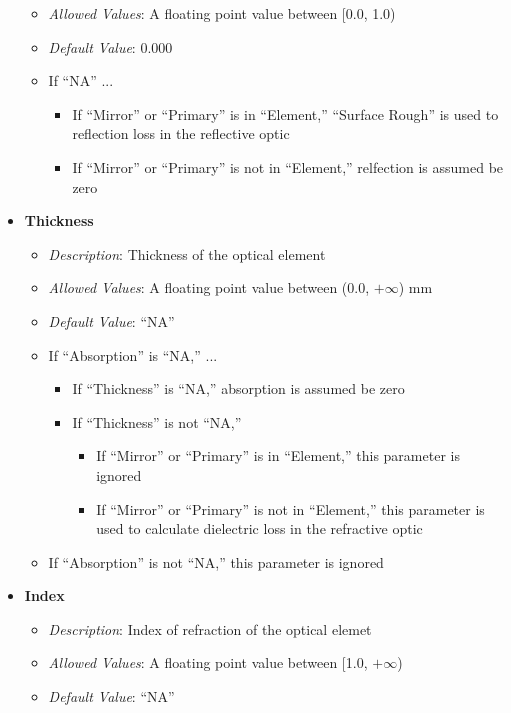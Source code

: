 \documentclass[11pt]{article} %
\begin{document}
\begin{itemize}[noitemsep,topsep=0pt]
\begin{itemize}[noitemsep,topsep=0pt]
		\item \textit{Allowed Values}: A floating point value between [0.0, 1.0)
		\item \textit{Default Value}: 0.000
		\item If ``NA'' ...
			\begin{itemize}[noitemsep,topsep=0pt]
			\item If ``Mirror'' or ``Primary'' is in ``Element,'' ``Surface Rough'' is used to reflection loss in the reflective optic
			\item If ``Mirror'' or ``Primary'' is not in ``Element,'' relfection is assumed be zero
			\end{itemize}
		\end{itemize}
	\item \textbf{Thickness}
		\begin{itemize}[noitemsep,topsep=0pt]
		\item \textit{Description}: Thickness of the optical element
		\item \textit{Allowed Values}: A floating point value between (0.0, $+\infty$) mm
		\item \textit{Default Value}: ``NA''
		\item If ``Absorption'' is ``NA,'' ... 
			\begin{itemize}[noitemsep,topsep=0pt]
			\item If ``Thickness'' is ``NA,'' absorption is assumed be zero
			\item If ``Thickness'' is not ``NA,'' 
				\begin{itemize}[noitemsep,topsep=0pt]
				\item If ``Mirror'' or ``Primary'' is in ``Element,'' this parameter is ignored
				\item If ``Mirror'' or ``Primary'' is not in ``Element,'' this parameter is used to calculate dielectric loss in the refractive optic
				\end{itemize}
			\end{itemize}
		\item If ``Absorption'' is not ``NA,'' this parameter is ignored
		\end{itemize}
	\item \textbf{Index}
		\begin{itemize}[noitemsep,topsep=0pt]
		\item \textit{Description}: Index of refraction of the optical elemet 
		\item \textit{Allowed Values}: A floating point value between [1.0, $+\infty$)
		\item \textit{Default Value}: ``NA''

\end{itemize}
\end{itemize}
\end{document}
